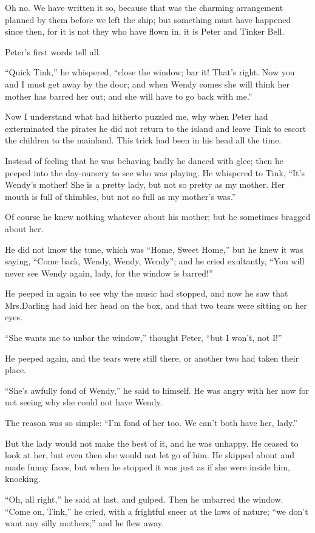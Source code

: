 Oh no.
We have written it so, because that was the charming arrangement planned by them before we left the ship;
but something must have happened since then,
for it is not they who have flown in, it is Peter and Tinker Bell.

Peter’s first words tell all.

“Quick Tink,” he whispered, “close the window;
bar it!
That’s right.
Now you and I must get away by the door;
and when Wendy comes she will think her mother has barred her out;
and she will have to go back with me.”

Now I understand what had hitherto puzzled me,
why when Peter had exterminated the pirates
he did not return to the island and leave Tink to escort the children to the mainland.
This trick had been in his head all the time.

Instead of feeling that he was behaving badly he danced with glee;
then he peeped into the day-nursery to see who was playing.
He whispered to Tink, “It’s Wendy’s mother!
She is a pretty lady, but not so pretty as my mother.
Her mouth is full of thimbles, but not so full as my mother’s was.”

Of course he knew nothing whatever about his mother;
but he sometimes bragged about her.

He did not know the tune,
which was “Home, Sweet Home,”
but he knew it was saying, “Come back, Wendy, Wendy, Wendy”;
and he cried exultantly,
“You will never see Wendy again, lady, for the window is barred!”

He peeped in again to see why the music had stopped,
and now he saw that Mrs.\@ Darling had laid her head on the box,
and that two tears were sitting on her eyes.

“She wants me to unbar the window,” thought Peter,
“but I won’t, not I\@!”

He peeped again, and the tears were still there, or another two had taken their place.

“She’s awfully fond of Wendy,” he said to himself.
He was angry with her now for not seeing why she could not have Wendy.

The reason was so simple:
“I’m fond of her too.
We can’t both have her, lady.”

But the lady would not make the best of it, and he was unhappy.
He ceased to look at her, but even then she would not let go of him.
He skipped about and made funny faces,
but when he stopped it was just as if she were inside him, knocking.

“Oh, all right,” he said at last, and gulped.
Then he unbarred the window.
“Come on, Tink,” he cried, with a frightful sneer at the laws of nature;
“we don’t want any silly mothers;” and he flew away.

